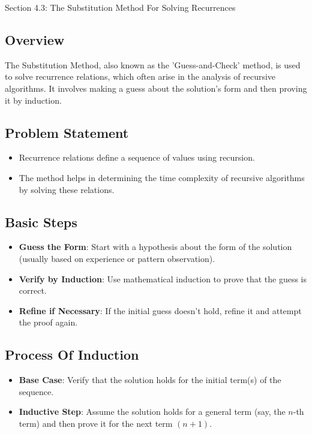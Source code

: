 \begin{notes}{Section 4.3: The Substitution Method For Solving Recurrences}
    \subsection*{Overview}

    The Substitution Method, also known as the 'Guess-and-Check' method, is used to solve recurrence relations, which often arise in the analysis of recursive algorithms. It involves making a guess 
    about the solution's form and then proving it by induction. \vspace*{1em}

    \subsection*{Problem Statement}

    \begin{itemize}
        \item Recurrence relations define a sequence of values using recursion.
        \item The method helps in determining the time complexity of recursive algorithms by solving these relations.
    \end{itemize}

    \subsection*{Basic Steps}

    \begin{itemize}
        \item \textbf{Guess the Form}: Start with a hypothesis about the form of the solution (usually based on experience or pattern observation).
        \item \textbf{Verify by Induction}: Use mathematical induction to prove that the guess is correct.
        \item \textbf{Refine if Necessary}: If the initial guess doesn't hold, refine it and attempt the proof again.
    \end{itemize}

    \subsection*{Process Of Induction}

    \begin{itemize}
        \item \textbf{Base Case}: Verify that the solution holds for the initial term(s) of the sequence.
        \item \textbf{Inductive Step}: Assume the solution holds for a general term (say, the $n$-th term) and then prove it for the next term $(n + 1)$.
    \end{itemize}


\end{notes}
